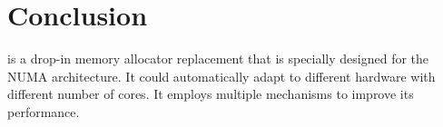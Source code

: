 \section*{Conclusion}
\NM{} is a drop-in memory allocator replacement that is specially designed for the NUMA architecture. It could automatically adapt to different hardware with different number of cores. It employs multiple mechanisms to improve its performance. 